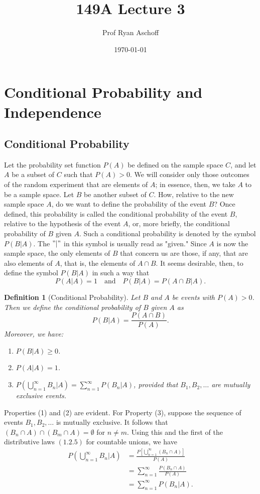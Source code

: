 \documentclass[12pt]{article}
\title{149A Lecture 3}
\author{Prof Ryan Aschoff}
\date{\today}
\newtheorem{definition}[theorem]{Definition}
\let\Section=\section
\def\section{\setcounter{equation}{0}\Section}
\newcommand{\1}{{\bf 1}}
\newcommand{\2}{{\bf 2}}
\begin{document}
\maketitle

\section{Conditional Probability and Independence}
\subsection{Conditional Probability}
Let the probability set function $P(A)$ be defined on the sample space $C$, and let $A$ be a subset of $C$ such that $P(A) > 0$. We will consider only those outcomes of the random experiment that are elements of $A$; in essence, then, we take $A$ to be a sample space. Let $B$ be another subset of $C$. How, relative to the new sample space $A$, do we want to define the probability of the event $B$? Once defined, this probability is called the conditional probability of the event $B$, relative to the hypothesis of the event $A$, or, more briefly, the conditional probability of $B$ given $A$. Such a conditional probability is denoted by the symbol $P(B|A)$. The $"|"$ in this symbol is usually read as "given."
Since $A$ is now the sample space, the only elements of $B$ that concern us are those, if any, that are also elements of $A$, that is, the elements of $A \cap B$. It seems desirable, then, to define the symbol $P(B|A)$ in such a way that
\[
P(A|A) = 1 \quad \text{and} \quad P(B|A) = P(A \cap B|A).
\]
\begin{definition}[Conditional Probability] Let $B$ and $A$ be events with $P(A) > 0$. Then we define the conditional probability of $B$ given $A$ as
\[
P(B|A) = \frac{P(A \cap B)}{P(A)}.
\]
Moreover, we have:
\begin{enumerate}
    \item $P(B|A) \geq 0$.
    \item $P(A|A) = 1$.
    \item $P\left(\bigcup_{n=1}^{\infty} B_n | A\right) = \sum_{n=1}^{\infty} P(B_n | A)$, provided that $B_1, B_2, \ldots$ are mutually exclusive events.
\end{enumerate}
\end{definition}
Properties (1) and (2) are evident. For Property (3), suppose the sequence of events $B_1, B_2, \ldots$ is mutually exclusive. It follows that $(B_n \cap A) \cap (B_m \cap A) = \emptyset$ for $n \neq m$. Using this and the first of the distributive laws $(1.2.5)$ for countable unions, we have
\begin{align*}
P\left(\bigcup_{n=1}^{\infty} B_n | A\right) &= \frac{ P\left[\bigcup_{n=1}^{\infty} (B_n \cap A)\right] }{P(A)}\\
&=  \sum_{n=1}^{\infty} \frac{P(B_n \cap A)} {P(A)} \\
&= \sum_{n=1}^{\infty} P(B_n | A).
\end{align*}
\end{document}
